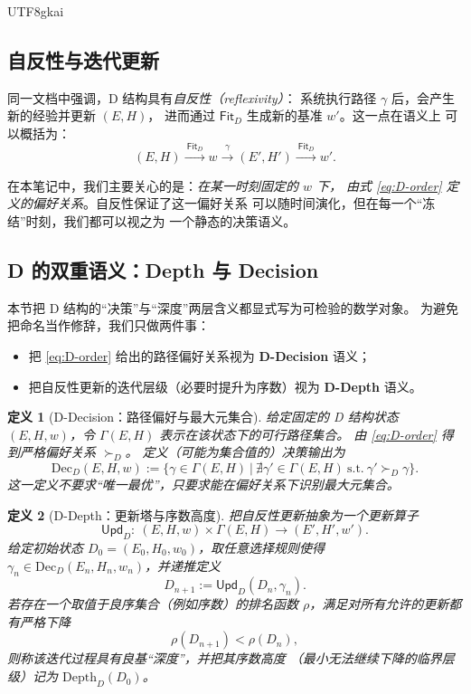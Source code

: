 \documentclass[12pt]{article}
\newtheorem{definition}{定义}[section]
\begin{document}
\begin{CJK*}{UTF8}{gkai}
\subsection{自反性与迭代更新}

同一文档中强调，D 结构具有\emph{自反性（reflexivity）}：
系统执行路径 $\gamma$ 后，会产生新的经验并更新 $(E,H)$，
进而通过 $\mathsf{Fit}_D$ 生成新的基准 $w'$。这一点在语义上
可以概括为：
\[
  (E,H) \xrightarrow{\ \mathsf{Fit}_D\ } w
  \xrightarrow{\ \gamma\ } (E',H') \xrightarrow{\ \mathsf{Fit}_D\ } w'.
\]

在本笔记中，我们主要关心的是：\emph{在某一时刻固定的 $w$ 下，
由式 \eqref{eq:D-order} 定义的偏好关系}。自反性保证了这一偏好关系
可以随时间演化，但在每一个“冻结”时刻，我们都可以视之为
一个静态的决策语义。

\subsection{D 的双重语义：Depth 与 Decision}\label{sec:D-dual}

本节把 D 结构的“决策”与“深度”两层含义都显式写为可检验的数学对象。
为避免把命名当作修辞，我们只做两件事：
\begin{itemize}
  \item 把 \eqref{eq:D-order} 给出的路径偏好关系视为 \textbf{D-Decision} 语义；
  \item 把自反性更新的迭代层级（必要时提升为序数）视为 \textbf{D-Depth} 语义。
\end{itemize}

\begin{definition}[D-Decision：路径偏好与最大元集合]
给定固定的 D 结构状态 $(E,H,w)$，令 $\Gamma(E,H)$ 表示在该状态下的可行路径集合。
由 \eqref{eq:D-order} 得到严格偏好关系 $\succ_D$。
定义（可能为集合值的）决策输出为
\[
  \mathrm{Dec}_D(E,H,w)
  :=
  \bigl\{
    \gamma\in\Gamma(E,H)\ \big|\ \nexists\gamma'\in\Gamma(E,H)\ \text{s.t.}\ \gamma'\succ_D\gamma
  \bigr\}.
\]
这一定义不要求“唯一最优”，只要求能在偏好关系下识别最大元集合。
\end{definition}

\begin{definition}[D-Depth：更新塔与序数高度]
把自反性更新抽象为一个更新算子
\[
  \mathsf{Upd}_D:\ (E,H,w)\times\Gamma(E,H)\longrightarrow (E',H',w').
\]
给定初始状态 $D_0=(E_0,H_0,w_0)$，取任意选择规则使得
$\gamma_n\in\mathrm{Dec}_D(E_n,H_n,w_n)$，并递推定义
\[
  D_{n+1}:=\mathsf{Upd}_D(D_n,\gamma_n).
\]
若存在一个取值于良序集合（例如序数）的\emph{排名函数}
$\rho$，满足对所有允许的更新都有严格下降
\[
  \rho(D_{n+1})<\rho(D_n),
\]
则称该迭代过程具有良基“深度”，并把其\emph{序数高度}
（最小无法继续下降的临界层级）记为 $\mathrm{Depth}_D(D_0)$。
\end{definition}


\end{CJK*}
\end{document}
